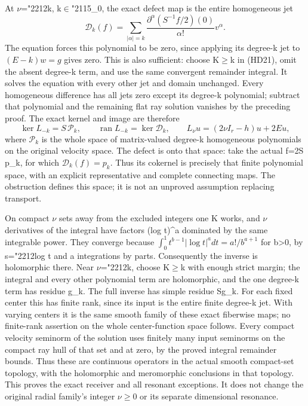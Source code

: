 \documentclass[
  11pt,
]{article}
\begin{document}
At \ensuremath{\nu}={\ReaderSymbols\char"2212}k, k\ensuremath{\in}{\ReaderSymbols\char"2115}\_0, the exact defect map is the entire homogeneous jet \[
\mathscr D_k(f)=
 \sum_{|\alpha|=k}\frac{\partial^\alpha(S^{-1}f/2)(0)}{\alpha!}
                         v^\alpha.
\tag{HD22}
\] The equation forces this polynomial to be zero, since applying its
degree-k jet to \((E-k)w=g\) gives zero. This is also sufficient: choose
K\ensuremath{\geq}k in (HD21), omit the absent degree-k term, and use the same
convergent remainder integral. It solves the equation with every other
jet and domain unchanged. Every homogeneous difference has all jets zero
except its degree-k polynomial; subtract that polynomial and the
remaining flat ray solution vanishes by the preceding proof. The exact
kernel and image are therefore \[
\ker L_{-k}=S\,\mathcal P_k,
\qquad
\operatorname{ran}L_{-k}=\ker\mathscr D_k,
\qquad
L_\nu u=(2\nu I_r-h)u+2Eu,
\tag{HD23}
\] where \(\mathcal P_k\) is the whole space of matrix-valued degree-k
homogeneous polynomials on the original velocity space. The defect is
onto that space: take the actual f=2S p\_k, for which
\(\mathscr D_k(f)=p_k\). Thus its cokernel is precisely that finite
polynomial space, with an explicit representative and complete
connecting maps. The obstruction defines this space; it is not an
unproved assumption replacing transport.

On compact \ensuremath{\nu} sets away from the excluded integers one K works, and \ensuremath{\nu}
derivatives of the integral have factors (log t)\^{}a dominated by the
same integrable power. They converge because
\(\int_0^1t^{b-1}|\log t|^a dt=a!/b^{a+1}\) for b\textgreater0, by
s={\ReaderSymbols\char"2212}log t and a integrations by parts. Consequently the inverse is
holomorphic there. Near \ensuremath{\nu}={\ReaderSymbols\char"2212}k, choose K\ensuremath{\geq}k with enough strict margin; the
integral and every other polynomial term are holomorphic, and the one
degree-k term has residue g\_k. The full inverse has simple residue
Sg\_k. For each fixed center this has finite rank, since its input is
the entire finite degree-k jet. With varying centers it is the same
smooth family of these exact fiberwise maps; no finite-rank assertion on
the whole center-function space follows. Every compact velocity seminorm
of the solution uses finitely many input seminorms on the compact ray
hull of that set and at zero, by the proved integral remainder bounds.
Thus these are continuous operators in the actual smooth compact-set
topology, with the holomorphic and meromorphic conclusions in that
topology. This proves the exact receiver and all resonant exceptions. It
does not change the original radial family's integer \ensuremath{\nu}\ensuremath{\geq}0 or its separate
dimensional resonance.
\end{document}
